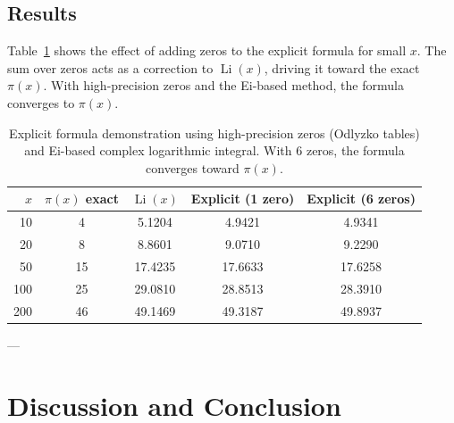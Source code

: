 \documentclass[11pt]{amsart}
\theoremstyle{definition}
\begin{document}
\subsection{Results}
Table~\ref{tab:explicit} shows the effect of adding zeros to the explicit formula for small $x$. The sum over zeros acts as a correction to $\operatorname{Li}(x)$, driving it toward the exact $\pi(x)$. With high-precision zeros and the Ei-based method, the formula converges to $\pi(x)$.

\begin{table}[h!]
\centering
\small
\begin{tabular}{rcccc}
\toprule
\textbf{$x$} & \textbf{$\pi(x)$ exact} & \textbf{$\operatorname{Li}(x)$} & \textbf{Explicit (1 zero)} & \textbf{Explicit (6 zeros)} \\
\midrule
10 & 4 & 5.1204 & 4.9421 & 4.9341 \\
20 & 8 & 8.8601 & 9.0710 & 9.2290 \\
50 & 15 & 17.4235 & 17.6633 & 17.6258 \\
100 & 25 & 29.0810 & 28.8513 & 28.3910 \\
200 & 46 & 49.1469 & 49.3187 & 49.8937 \\
\bottomrule
\end{tabular}
\caption{Explicit formula demonstration using high-precision zeros (Odlyzko tables) and Ei-based complex logarithmic integral. With 6 zeros, the formula converges toward $\pi(x)$.}
\label{tab:explicit}
\end{table}

---

\section{Discussion and Conclusion}
\end{document}
